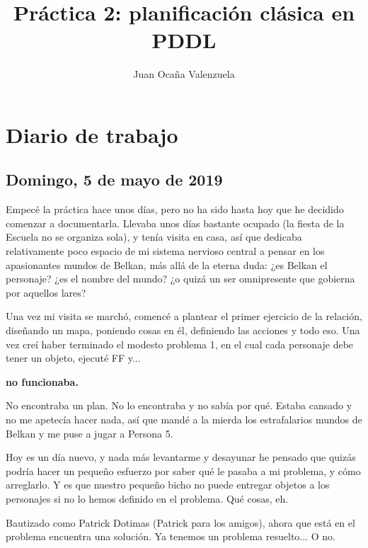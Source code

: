 \documentclass[11pt,a4paper]{article}
\author{	Juan Ocaña Valenzuela}
\title{\textbf{Práctica 2: planificación clásica en PDDL}}
\begin{document}
\thispagestyle{empty}

\maketitle

\newpage

\tableofcontents

\newpage

\section{Diario de trabajo}

\subsection*{Domingo, 5 de mayo de 2019}
Empecé la práctica hace unos días, pero no ha sido hasta hoy que he decidido comenzar a documentarla.
Llevaba unos días bastante ocupado (la fiesta de la Escuela no se organiza sola), y tenía visita en casa, así que dedicaba
relativamente poco espacio de mi sistema nervioso central a pensar en los apasionantes mundos de Belkan, más allá de la 
eterna duda: ¿es Belkan el personaje? ¿es el nombre del mundo? ¿o quizá un ser omnipresente que gobierna por aquellos lares?


Una vez mi visita se marchó, comencé a plantear el primer ejercicio de la relación, diseñando un mapa, poniendo cosas en él,
definiendo las acciones y todo eso. Una vez creí haber terminado el modesto problema 1, en el cual cada personaje debe tener un
objeto, ejecuté FF y...


\textbf{no funcionaba.}

\bigskip

No encontraba un plan. No lo encontraba y no sabía por qué. Estaba cansado y no me apetecía hacer nada, así que mandé a la
mierda los estrafalarios mundos de Belkan y me puse a jugar a Persona 5.

\medskip

Hoy es un día nuevo, y nada más levantarme y desayunar he pensado que quizás podría hacer un pequeño esfuerzo por saber 
qué le pasaba a mi problema, y cómo arreglarlo. Y es que nuestro pequeño bicho no puede entregar objetos a los personajes
si no lo hemos definido en el problema. Qué cosas, eh.

\medskip

Bautizado como Patrick Dotimas (Patrick para los amigos), ahora que está en el problema encuentra una solución.
Ya tenemos un problema resuelto... O no.
\end{document}
